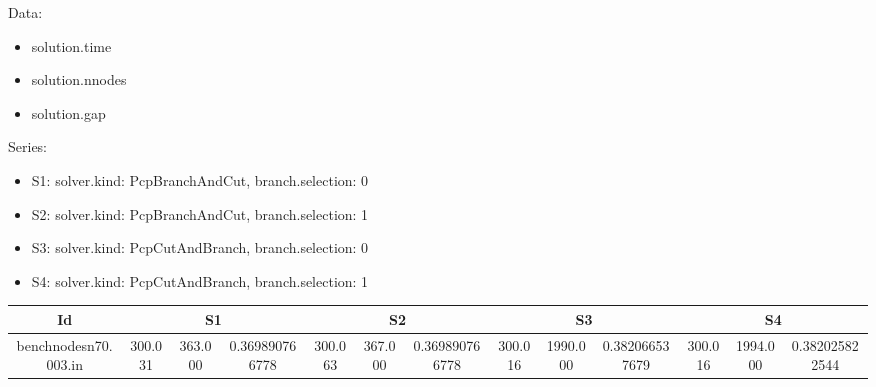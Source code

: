 \documentclass[landscape, 12pt]{report}
\begin{document}
\tiny
Data:
\begin{itemize}
\item solution.time
\item solution.nnodes
\item solution.gap
\end{itemize}
Series:
\begin{itemize}
\item S1: solver.kind: PcpBranchAndCut, branch.selection: 0
\item S2: solver.kind: PcpBranchAndCut, branch.selection: 1
\item S3: solver.kind: PcpCutAndBranch, branch.selection: 0
\item S4: solver.kind: PcpCutAndBranch, branch.selection: 1
\end{itemize}
\begin{tabular}{|c|ccc|ccc|ccc|ccc|}
\hline
\multicolumn{1}{|c|}{Id} & \multicolumn{3}{|c|}{S1} & \multicolumn{3}{|c|}{S2} & \multicolumn{3}{|c|}{S3} & \multicolumn{3}{|c|}{S4}
\\
\hline
benchnodesn70.003.in & 300.031 & 363.000 & 0.369890766778 & 300.063 & 367.000 & 0.369890766778 & 300.016 & 1990.000 & 0.382066537679 & 300.016 & 1994.000 & 0.382025822544
\\
\hline 
 \end{tabular}
\end{document}
